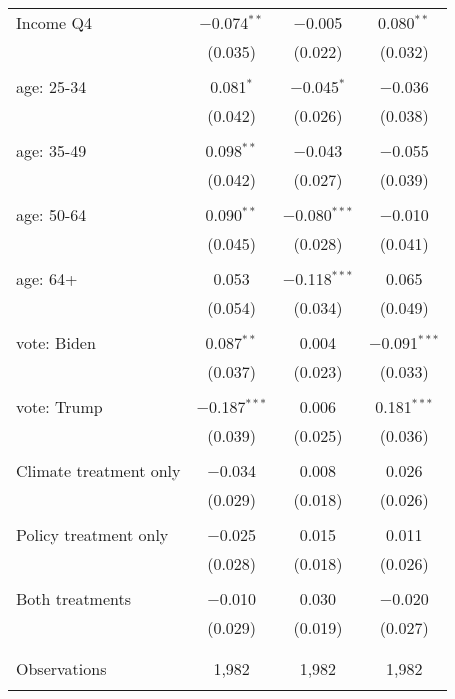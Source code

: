 \begin{tabular}{@{\extracolsep{5pt}}lccc}
 Income Q4 & $-$0.074$^{**}$ & $-$0.005 & 0.080$^{**}$ \\ 
  & (0.035) & (0.022) & (0.032) \\ 
  & & & \\ 
 age: 25-34 & 0.081$^{*}$ & $-$0.045$^{*}$ & $-$0.036 \\ 
  & (0.042) & (0.026) & (0.038) \\ 
  & & & \\ 
 age: 35-49 & 0.098$^{**}$ & $-$0.043 & $-$0.055 \\ 
  & (0.042) & (0.027) & (0.039) \\ 
  & & & \\ 
 age: 50-64 & 0.090$^{**}$ & $-$0.080$^{***}$ & $-$0.010 \\ 
  & (0.045) & (0.028) & (0.041) \\ 
  & & & \\ 
 age: 64+ & 0.053 & $-$0.118$^{***}$ & 0.065 \\ 
  & (0.054) & (0.034) & (0.049) \\ 
  & & & \\ 
 vote: Biden & 0.087$^{**}$ & 0.004 & $-$0.091$^{***}$ \\ 
  & (0.037) & (0.023) & (0.033) \\ 
  & & & \\ 
 vote: Trump & $-$0.187$^{***}$ & 0.006 & 0.181$^{***}$ \\ 
  & (0.039) & (0.025) & (0.036) \\ 
  & & & \\ 
 Climate treatment only & $-$0.034 & 0.008 & 0.026 \\ 
  & (0.029) & (0.018) & (0.026) \\ 
  & & & \\ 
 Policy treatment only & $-$0.025 & 0.015 & 0.011 \\ 
  & (0.028) & (0.018) & (0.026) \\ 
  & & & \\ 
 Both treatments & $-$0.010 & 0.030 & $-$0.020 \\ 
  & (0.029) & (0.019) & (0.027) \\ 
  & & & \\ 
\hline \\[-1.8ex] 

Observations & 1,982 & 1,982 & 1,982 \\ 
\hline 
\hline \\[-1.8ex] 
\end{tabular} 